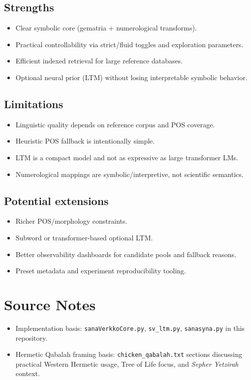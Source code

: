 \documentclass[11pt,a4paper]{report}
\begin{document}
\section{Strengths}
\begin{itemize}
  \item Clear symbolic core (gematria + numerological transforms).
  \item Practical controllability via strict/fluid toggles and exploration parameters.
  \item Efficient indexed retrieval for large reference databases.
  \item Optional neural prior (LTM) without losing interpretable symbolic behavior.
\end{itemize}

\section{Limitations}
\begin{itemize}
  \item Linguistic quality depends on reference corpus and POS coverage.
  \item Heuristic POS fallback is intentionally simple.
  \item LTM is a compact model and not as expressive as large transformer LMs.
  \item Numerological mappings are symbolic/interpretive, not scientific semantics.
\end{itemize}

\section{Potential extensions}
\begin{itemize}
  \item Richer POS/morphology constraints.
  \item Subword or transformer-based optional LTM.
  \item Better observability dashboards for candidate pools and fallback reasons.
  \item Preset metadata and experiment reproducibility tooling.
\end{itemize}

\chapter*{Source Notes}
\begin{itemize}
  \item Implementation basis: \texttt{sanaVerkkoCore.py}, \texttt{sv\_ltm.py}, \texttt{sanasyna.py} in this repository.
  \item Hermetic Qabalah framing basis: \texttt{chicken\_qabalah.txt} sections discussing practical Western Hermetic usage, Tree of Life focus, and \textit{Sepher Yetzirah} context.
\end{itemize}
\end{document}
